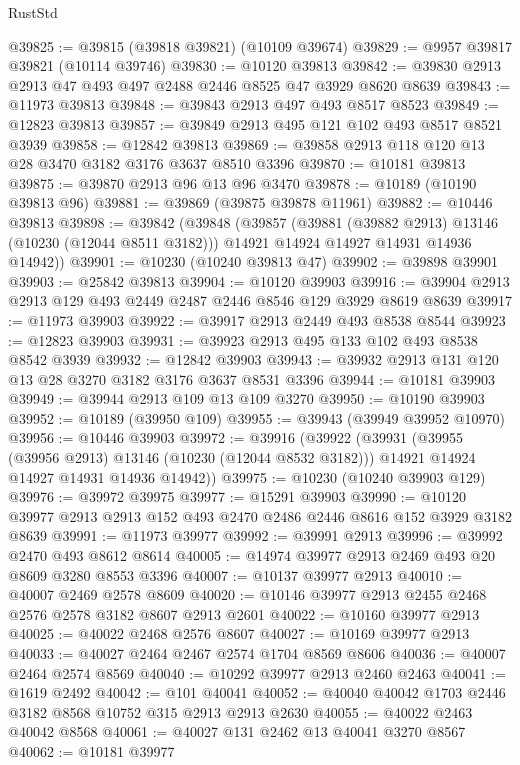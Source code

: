 \begin{lexlean}{RustStd}
\begin{coremodule}
@39825 := @39815 (@39818 @39821) (@10109 @39674)
@39829 := @9957 @39817 @39821 (@10114 @39746)
@39830 := @10120 @39813
@39842 := @39830 @2913 @2913 @47 @493 @497 @2488 @2446 @8525 @47 @3929 @8620 @8639
@39843 := @11973 @39813
@39848 := @39843 @2913 @497 @493 @8517 @8523
@39849 := @12823 @39813
@39857 := @39849 @2913 @495 @121 @102 @493 @8517 @8521 @3939
@39858 := @12842 @39813
@39869 := @39858 @2913 @118 @120 @13 @28 @3470 @3182 @3176 @3637 @8510 @3396
@39870 := @10181 @39813
@39875 := @39870 @2913 @96 @13 @96 @3470
@39878 := @10189 (@10190 @39813 @96)
@39881 := @39869 (@39875 @39878 @11961)
@39882 := @10446 @39813
@39898 := @39842
    (@39848
      (@39857
        (@39881 (@39882 @2913) @13146 (@10230 (@12044 @8511 @3182)))
        @14921
        @14924
        @14927
        @14931
        @14936
        @14942))
@39901 := @10230 (@10240 @39813 @47)
@39902 := @39898 @39901
@39903 := @25842 @39813
@39904 := @10120 @39903
@39916 := @39904 @2913 @2913 @129 @493 @2449 @2487 @2446 @8546 @129 @3929 @8619 @8639
@39917 := @11973 @39903
@39922 := @39917 @2913 @2449 @493 @8538 @8544
@39923 := @12823 @39903
@39931 := @39923 @2913 @495 @133 @102 @493 @8538 @8542 @3939
@39932 := @12842 @39903
@39943 := @39932 @2913 @131 @120 @13 @28 @3270 @3182 @3176 @3637 @8531 @3396
@39944 := @10181 @39903
@39949 := @39944 @2913 @109 @13 @109 @3270
@39950 := @10190 @39903
@39952 := @10189 (@39950 @109)
@39955 := @39943 (@39949 @39952 @10970)
@39956 := @10446 @39903
@39972 := @39916
    (@39922
      (@39931
        (@39955 (@39956 @2913) @13146 (@10230 (@12044 @8532 @3182)))
        @14921
        @14924
        @14927
        @14931
        @14936
        @14942))
@39975 := @10230 (@10240 @39903 @129)
@39976 := @39972 @39975
@39977 := @15291 @39903
@39990 := @10120 @39977 @2913 @2913 @152 @493 @2470 @2486 @2446 @8616 @152 @3929 @3182 @8639
@39991 := @11973 @39977
@39992 := @39991 @2913
@39996 := @39992 @2470 @493 @8612 @8614
@40005 := @14974 @39977 @2913 @2469 @493 @20 @8609 @3280 @8553 @3396
@40007 := @10137 @39977 @2913
@40010 := @40007 @2469 @2578 @8609
@40020 := @10146 @39977 @2913 @2455 @2468 @2576 @2578 @3182 @8607 @2913 @2601
@40022 := @10160 @39977 @2913
@40025 := @40022 @2468 @2576 @8607
@40027 := @10169 @39977 @2913
@40033 := @40027 @2464 @2467 @2574 @1704 @8569 @8606
@40036 := @40007 @2464 @2574 @8569
@40040 := @10292 @39977 @2913 @2460 @2463
@40041 := @1619 @2492
@40042 := @101 @40041
@40052 := @40040 @40042 @1703 @2446 @3182 @8568 @10752 @315 @2913 @2913 @2630
@40055 := @40022 @2463 @40042 @8568
@40061 := @40027 @131 @2462 @13 @40041 @3270 @8567
@40062 := @10181 @39977

\end{coremodule}
\end{lexlean}
